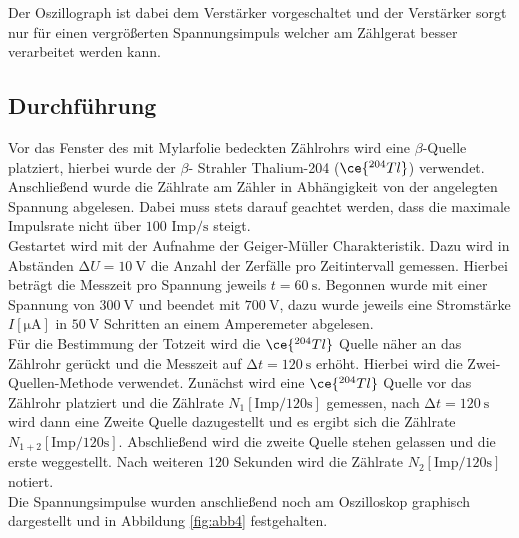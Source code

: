 Der Oszillograph ist dabei dem Verstärker vorgeschaltet und der Verstärker sorgt nur für einen vergrößerten Spannungsimpuls welcher am Zählgerat besser verarbeitet werden kann.


\subsection{Durchführung}
Vor das Fenster des mit Mylarfolie bedeckten Zählrohrs wird eine $\beta$-Quelle platziert, hierbei wurde der $\beta$- Strahler Thalium-204 ($\ce{^{204}_{}Tl}$) verwendet. Anschließend wurde die Zählrate
am Zähler in Abhängigkeit von der angelegten Spannung abgelesen. Dabei muss stets darauf geachtet werden, dass die maximale Impulsrate nicht über $100$ $\text{Imp}/{\si{\second}}$ steigt. %
\newline
\\
Gestartet wird mit der Aufnahme der Geiger-Müller Charakteristik. Dazu wird in Abständen $\increment U = \SI{10}{\volt}$ die Anzahl der Zerfälle pro Zeitintervall gemessen. Hierbei beträgt die
Messzeit pro Spannung jeweils $t = \SI{60}{\second}$.
Begonnen wurde mit einer Spannung
von $\SI{300}{\volt}$ und beendet mit $\SI{700}{\volt}$, dazu wurde jeweils eine Stromstärke $I [\si{\micro\ampere}]$ in $\SI{50}{\volt}$ Schritten an einem Amperemeter abgelesen. 
\newline
\\
Für die Bestimmung der Totzeit wird die $\ce{^{204}_{}Tl}$ Quelle näher an das Zählrohr gerückt und die Messzeit auf $\increment t = \SI{120}{\second}$ erhöht. Hierbei wird die Zwei-Quellen-Methode %
verwendet. Zunächst wird eine $\ce{^{204}_{}Tl}$ Quelle vor das Zählrohr platziert und die Zählrate $N_{1} [\text{Imp}/120{\si{\second}}]$ gemessen, nach $\increment t = \SI{120}{\second}$ wird dann eine Zweite Quelle 
dazugestellt und es ergibt sich die Zählrate $N_{1+2} [\text{Imp}/120{\si{\second}}]$. Abschließend wird die zweite Quelle stehen gelassen und die erste weggestellt. Nach weiteren 120 Sekunden wird
die Zählrate  $N_{2} [\text{Imp}/120{\si{\second}}]$ notiert.
\newline
\\
Die Spannungsimpulse wurden anschließend noch am Oszilloskop graphisch dargestellt und in Abbildung \ref{fig:abb4} festgehalten.